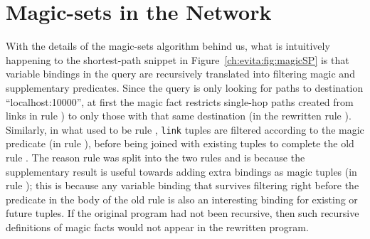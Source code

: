 
\section{Magic-sets in the Network}

With the details of the magic-sets algorithm behind us, what is
intuitively happening to the shortest-path snippet in
Figure~\ref{ch:evita:fig:magicSP} is that variable bindings in the query are
recursively translated into filtering magic and supplementary
predicates. Since the query is only looking for paths to
destination ``localhost:10000'', at first the magic fact restricts single-hop
paths created from links in rule ) to only those with that same 
destination (in the rewritten rule ). Similarly, in what used to 
be rule , {\tt link} tuples are filtered according to the magic predicate (in rule
), before being joined with existing  tuples to
complete the old rule . The reason rule  was split into
the two rules  and  is because the
supplementary result  is useful towards adding extra bindings as
magic tuples (in rule ); this is because any variable
binding that survives filtering right before the 
predicate in the body of the old rule  is also an interesting
binding for existing or future  tuples. If the original
program had not been recursive, then such recursive definitions of magic
facts would not appear in the rewritten program.

